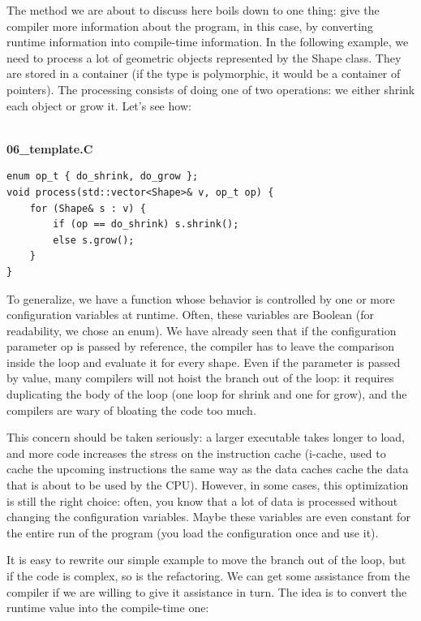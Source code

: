 
The method we are about to discuss here boils down to one thing: give the compiler more information about the program, in this case, by converting runtime information into compile-time information. In the following example, we need to process a lot of geometric objects represented by the Shape class. They are stored in a container (if the type is polymorphic, it would be a container of pointers). The processing consists of doing one of two operations: we either shrink each object or grow it. Let's see how:

\hspace*{\fill} \\ %
\noindent
\textbf{06\_template.C}
\begin{lstlisting}[style=styleCXX]
enum op_t { do_shrink, do_grow };
void process(std::vector<Shape>& v, op_t op) {
	for (Shape& s : v) {
		if (op == do_shrink) s.shrink();
		else s.grow();
	}
}
\end{lstlisting}

To generalize, we have a function whose behavior is controlled by one or more configuration variables at runtime. Often, these variables are Boolean (for readability, we chose an enum). We have already seen that if the configuration parameter op is passed by reference, the compiler has to leave the comparison inside the loop and evaluate it for every shape. Even if the parameter is passed by value, many compilers will not hoist the branch out of the loop: it requires duplicating the body of the loop (one loop for shrink and one for grow), and the compilers are wary of bloating the code too much. 

This concern should be taken seriously: a larger executable takes longer to load, and more code increases the stress on the instruction cache (i-cache, used to cache the upcoming instructions the same way as the data caches cache the data that is about to be used by the CPU). However, in some cases, this optimization is still the right choice: often, you know that a lot of data is processed without changing the configuration variables. Maybe these variables are even constant for the entire run of the program (you load the configuration once and use it). 

It is easy to rewrite our simple example to move the branch out of the loop, but if the code is complex, so is the refactoring. We can get some assistance from the compiler if we are willing to give it assistance in turn. The idea is to convert the runtime value into the compile-time one:

